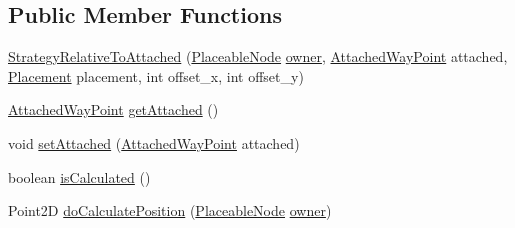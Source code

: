 \subsection*{Public Member Functions}
\begin{DoxyCompactItemize}
\item 
\hyperlink{classorg_1_1tzi_1_1use_1_1gui_1_1views_1_1diagrams_1_1elements_1_1positioning_1_1_strategy_relative_to_attached_a51d367bcffc59289a7f139ffc433bb25}{Strategy\-Relative\-To\-Attached} (\hyperlink{classorg_1_1tzi_1_1use_1_1gui_1_1views_1_1diagrams_1_1elements_1_1_placeable_node}{Placeable\-Node} \hyperlink{classorg_1_1tzi_1_1use_1_1gui_1_1views_1_1diagrams_1_1elements_1_1positioning_1_1_statefull_position_strategy_ac987ea0c7e5b6ddc09cc5afb41043dfd}{owner}, \hyperlink{classorg_1_1tzi_1_1use_1_1gui_1_1views_1_1diagrams_1_1waypoints_1_1_attached_way_point}{Attached\-Way\-Point} attached, \hyperlink{enumorg_1_1tzi_1_1use_1_1gui_1_1views_1_1diagrams_1_1elements_1_1positioning_1_1_strategy_relative_to_attached_1_1_placement}{Placement} placement, int offset\-\_\-x, int offset\-\_\-y)
\item 
\hyperlink{classorg_1_1tzi_1_1use_1_1gui_1_1views_1_1diagrams_1_1waypoints_1_1_attached_way_point}{Attached\-Way\-Point} \hyperlink{classorg_1_1tzi_1_1use_1_1gui_1_1views_1_1diagrams_1_1elements_1_1positioning_1_1_strategy_relative_to_attached_a97af668095f9906334f38d81b610d043}{get\-Attached} ()
\item 
void \hyperlink{classorg_1_1tzi_1_1use_1_1gui_1_1views_1_1diagrams_1_1elements_1_1positioning_1_1_strategy_relative_to_attached_a07bfe9806b096fe3716578264784b235}{set\-Attached} (\hyperlink{classorg_1_1tzi_1_1use_1_1gui_1_1views_1_1diagrams_1_1waypoints_1_1_attached_way_point}{Attached\-Way\-Point} attached)
\item 
boolean \hyperlink{classorg_1_1tzi_1_1use_1_1gui_1_1views_1_1diagrams_1_1elements_1_1positioning_1_1_strategy_relative_to_attached_a3c6a2949e09e44ec27797cfec90e2b97}{is\-Calculated} ()
\item 
Point2\-D \hyperlink{classorg_1_1tzi_1_1use_1_1gui_1_1views_1_1diagrams_1_1elements_1_1positioning_1_1_strategy_relative_to_attached_aa9d2903c876107ecb8eef36d1027fdcf}{do\-Calculate\-Position} (\hyperlink{classorg_1_1tzi_1_1use_1_1gui_1_1views_1_1diagrams_1_1elements_1_1_placeable_node}{Placeable\-Node} \hyperlink{classorg_1_1tzi_1_1use_1_1gui_1_1views_1_1diagrams_1_1elements_1_1positioning_1_1_statefull_position_strategy_ac987ea0c7e5b6ddc09cc5afb41043dfd}{owner})
\item 

\end{DoxyCompactItemize}
